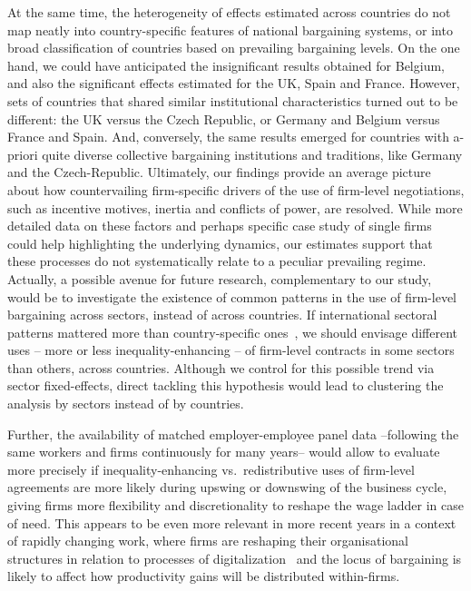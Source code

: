 \documentclass[12pt]{article}
\begin{document}
At the same time, the heterogeneity of effects estimated across countries do not map neatly into country-specific features of national bargaining systems, or into broad classification of countries based on prevailing bargaining levels. On the one hand, we could have anticipated the insignificant results obtained for Belgium, and also the significant effects estimated for the UK, Spain and France. However, sets of countries that shared similar institutional characteristics turned out to be different: the UK versus the Czech Republic, or Germany and Belgium versus France and Spain. And, conversely, the same results emerged for countries with a-priori quite diverse collective bargaining institutions and traditions, like Germany and the Czech-Republic. Ultimately, our findings provide an average picture about how countervailing firm-specific drivers of the use of firm-level negotiations, such as incentive motives, inertia and conflicts of power, are resolved. While more detailed data on these factors and perhaps specific case study of single firms could help highlighting the underlying dynamics, our estimates support that these processes do not systematically relate to a peculiar prevailing regime. Actually, a possible avenue for future research, complementary to our study, would be to investigate the existence of common patterns in the use of firm-level bargaining across sectors, instead of across countries. If international sectoral patterns mattered more than country-specific ones~\citep[as suggested in ][]{bechter2012sectors}, we should envisage different uses -- more or less inequality-enhancing -- of firm-level contracts in some sectors than others, across countries. Although we control for this possible trend via sector fixed-effects, direct tackling this hypothesis would lead to clustering the analysis by sectors instead of by countries. 

Further, the availability of matched employer-employee panel data --following the same workers and firms continuously for many years-- would allow to evaluate more precisely if inequality-enhancing vs.~redistributive uses of firm-level agreements are more likely during upswing or downswing of the business cycle, giving firms more flexibility and discretionality to reshape the wage ladder in case of need. This appears to be even more relevant in more recent years in a context of rapidly changing work, where firms are reshaping their organisational structures in relation to processes of digitalization~\citep{OECD2019} and the locus of bargaining is likely to affect how productivity gains will be distributed within-firms.
\end{document}
